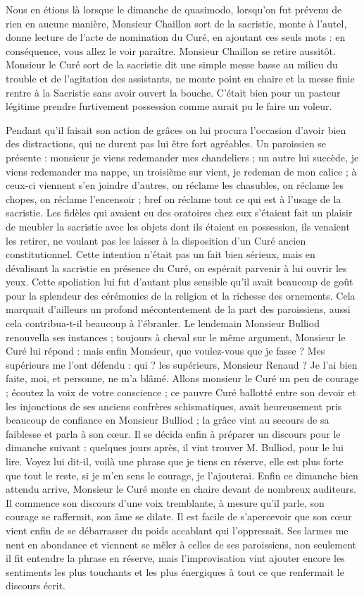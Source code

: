 \documentclass[11pt,a4paper]{report}
\begin{document}
Nous en étions là lorsque le dimanche de quasimodo, lorsqu'on fut prévenu de rien en aucune manière, Monsieur Chaillon sort de la sacristie, monte à l'autel, donne lecture de l'acte de nomination du Curé, en ajoutant ces seuls mots : en conséquence, vous allez le voir paraître. Monsieur Chaillon se retire aussitôt. Monsieur le Curé sort de la sacristie dit une simple messe basse au milieu du trouble et de l'agitation des assistants, ne monte point en chaire et la messe finie rentre à la Sacristie sans avoir ouvert la bouche. C'était bien pour un pasteur légitime prendre furtivement possession comme aurait pu le faire un voleur.

Pendant qu'il faisait son action de grâces on lui procura l'occasion d'avoir bien des distractions, qui ne durent pas lui être fort agréables. Un paroissien se présente : monsieur je viens redemander mes chandeliers ; un autre lui succède, je viens redemander ma nappe, un troisième sur vient, je redeman de mon calice ; à ceux-ci viennent s'en joindre d'autres, on réclame les chasubles, on réclame les chopes, on réclame l'encensoir ; bref on réclame tout ce qui est à l'usage de la sacristie. Les fidèles qui avaient eu des oratoires chez eux s'étaient fait un plaisir de meubler la sacristie avec les objets dont ils étaient en possession, ils venaient les retirer, ne voulant pas les laisser à la disposition d'un Curé ancien constitutionnel. Cette intention n'était pas un fait bien sérieux, mais en dévalisant la sacristie en présence du Curé, on espérait parvenir à lui ouvrir les yeux. Cette spoliation lui fut d'autant plus sensible qu'il avait beaucoup de goût pour la splendeur des cérémonies de la religion et la richesse des ornements. Cela marquait d'ailleurs un profond mécontentement de la part des paroissiens, aussi cela contribua-t-il beaucoup à l'ébranler. Le lendemain Monsieur Bulliod renouvella ses instances ; toujours à cheval sur le même argument, Monsieur le Curé lui répond : mais enfin Monsieur, que voulez-vous que je fasse ? Mes supérieurs me l'ont défendu : qui ? les supérieurs, Monsieur Renaud ? Je l'ai bien faite, moi, et personne, ne m'a blâmé. Allons monsieur le Curé un peu de courage ; écoutez la voix de votre conscience ; ce pauvre Curé ballotté entre son devoir et les injonctions de ses anciens confrères schismatiques, avait heureusement pris beaucoup de confiance en Monsieur Bulliod ; la grâce vint au secours de sa faiblesse et parla à son cœur. Il se décida enfin à préparer un discours pour le dimanche suivant : quelques jours après, il vint trouver M. Bulliod, pour le lui lire. Voyez lui dit-il, voilà une phrase que je tiens en réserve, elle est plus forte que tout le reste, si je m'en sens le courage, je l'ajouterai. Enfin ce dimanche bien attendu arrive, Monsieur le Curé monte en chaire devant de nombreux auditeurs. Il commence son discours d'une voix tremblante, à mesure qu'il parle, son courage se raffermit, son âme se dilate. Il est facile de s'apercevoir que son cœur vient enfin de se débarrasser du poids accablant qui l'oppressait. Ses larmes me nent en abondance et viennent se mêler à celles de ses paroissiens, non seulement il fit entendre la phrase en réserve, mais l'improvisation vint ajouter encore les sentiments les plus touchants et les plus énergiques à tout ce que renfermait le discours écrit.
\end{document}
